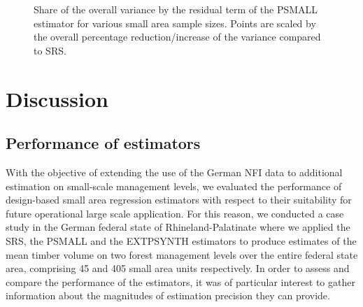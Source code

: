 \documentclass[remotesensing,article,submit,moreauthors,pdftex,10pt,a4paper]{mdpi}
\newcommand{\psmall}{PSMALL}
\newcommand{\extpsynth}{EXTPSYNTH}
\begin{document}
\begin{figure}[H]
	\centering
	\caption{Share of the overall variance by the residual term of the \psmall{} estimator for various small area sample sizes. Points are scaled by the overall percentage reduction/increase of the variance compared to SRS.}
	\label{fig:fail}
\end{figure}



\section{Discussion}
\label{sec:Dis}

\subsection{Performance of estimators}

With the objective of extending the use of the German NFI data to additional estimation on small-scale management levels, we evaluated the performance of design-based small area regression estimators with respect to their suitability for future operational large scale application. For this reason, we conducted a case study in the German federal state of Rhineland-Palatinate where we applied the SRS, the \psmall{} and the \extpsynth{} estimators to produce estimates of the mean timber volume on two forest management levels over the entire federal state area, comprising 45 and 405 small area units respectively. In order to assess and compare the performance of the estimators, it was of particular interest to gather information about the magnitudes of estimation precision they can provide.\par
\end{document}
